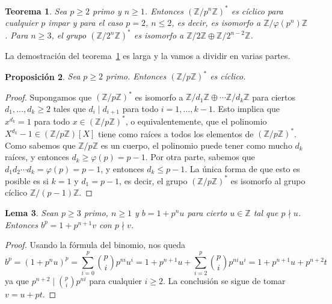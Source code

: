 \documentclass[a4paper, 11pt]{article}
\newcommand{\ZZ}{\mathbb{Z}}
\newcounter{numerodetema}
\theoremstyle{plain}
\newtheorem{teor}{Teorema}[numerodetema]
\newtheorem{lema}[teor]{Lema}
\newtheorem{prop}[teor]{Proposición}
\theoremstyle{definition}
\begin{document}
\begin{teor}\label{teor-estr}
Sea $p\geq 2$ primo y $n\geq 1$. Entonces $(\ZZ/p^n\ZZ)^*$ es cíclico para
cualquier $p$ impar y para el caso $p=2$, $n\leq 2$, es decir, es isomorfo
a $\ZZ/\varphi(p^n)\ZZ$. Para $n\geq 3$, el grupo $(\ZZ/2^n\ZZ)^*$ es
isomorfo a $\ZZ/2\ZZ\oplus\ZZ/2^{n-2}\ZZ$.
\end{teor}

La demostración del teorema~\ref{teor-estr} es larga y la vamos a dividir
en varias partes.

\begin{prop}\label{parte1}
Sea $p\geq 2$ primo. Entonces $(\ZZ/p\ZZ)^*$ es cíclico.
\end{prop}
\begin{proof}
Supongamos que $(\ZZ/p\ZZ)^*$ es isomorfo a $\ZZ/d_1\ZZ\oplus\cdots\ZZ/d_k\ZZ$
para ciertos $d_1,\ldots,d_k\geq 2$ tales que $d_i\mid d_{i+1}$ para todo
$i=1,\ldots,k-1$. Esto implica que $x^{d_k}=1$ para todo $x\in(\ZZ/p\ZZ)^*$,
o equivalentemente, que el polinomio $X^{d_k}-1\in(\ZZ/p\ZZ)[X]$ tiene como
raíces a todos los elementos de $(\ZZ/p\ZZ)^*$. Como sabemos que $\ZZ/p\ZZ$ es
un cuerpo, el polinomio puede tener como mucho $d_k$ raíces, y entonces
$d_k\geq \varphi(p)=p-1$. Por otra parte, sabemos que
$d_1d_2\cdots d_k=\varphi(p)=p-1$, y entonces $d_k\leq p-1$. La única forma de
que esto es posible es si $k=1$ y $d_1=p-1$, es decir, el grupo $(\ZZ/p\ZZ)^*$
es isomorfo al grupo cíclico $\ZZ/(p-1)\ZZ$.
\end{proof}

\begin{lema}\label{parte2}
Sean $p\geq 3$ primo, $n\geq 1$ y $b=1+p^nu$ para cierto $u\in\ZZ$ tal que
$p\nmid u$. Entonces $b^p=1+p^{n+1}v$ con $p\nmid v$.
\end{lema}
\begin{proof}
Usando la fórmula del binomio, nos queda
\[
   b^p=(1+p^nu)^p=
   \sum_{i=0}^p\binom{p}{i}p^{ni}u^i=
   1+p^{n+1}u+\sum_{i=2}^p\binom{p}{i}p^{ni}u^i=
   1+p^{n+1}u+p^{n+2}t
\]
ya que $p^{n+2}\mid\binom{p}{i}p^{ni}$ para cualquier $i\geq 2$. La conclusión
se sigue de tomar $v=u+pt$.
\end{proof}
\end{document}

